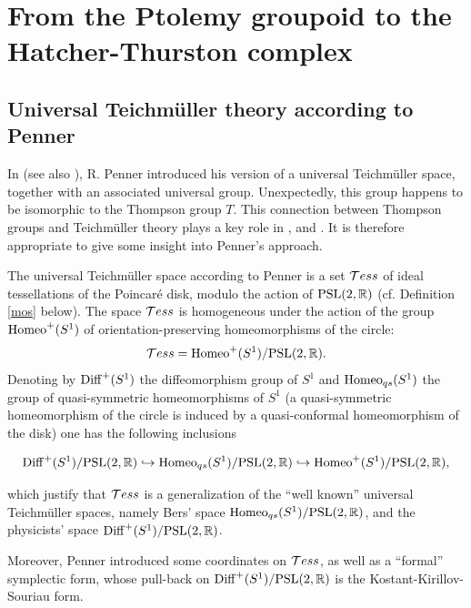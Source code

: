 \documentclass[twoside]{irmaems}
\theoremstyle{plain}
\theoremstyle{definition}
\theoremstyle{remark}
\newcommand{\R}{{\mathbb{R}}}
\begin{document}
\section{From the Ptolemy  groupoid to the Hatcher-Thurston complex}

\subsection{Universal Teichm\"uller theory according to Penner}

In \cite{pe0} (see also \cite{pe}), R. Penner introduced his version of a universal Teichm\"uller space, together with an associated universal group. 
Unexpectedly, this group happens to be 
isomorphic to the Thompson group $T$. This connection  between Thompson groups and Teichm\" uller 
theory plays a key role in \cite{fu-ka1}, \cite{fu-ka2} and \cite{fu-ka3}. It is therefore appropriate to 
give some insight into Penner's approach.


\vspace{0.1cm}\noindent 
The universal Teichm\"uller space  according to Penner is a set ${\cal T}ess$ of ideal tessellations of the Poincar\'e disk, modulo the action of ${\rm PSL}(2,\R)$ (cf. Definition \ref{mos} below). 
The space ${\cal T}ess$ is homogeneous under the action of the group ${\rm Homeo}^+(S^1)$
of orientation-preserving homeomorphisms of the circle:  
$${\cal T}ess={\rm Homeo}^+(S^1)/{\rm PSL}(2,\R).$$
Denoting by ${\rm Diff}^+(S^1)$ the diffeomorphism group of $S^1$ and ${\rm Homeo}_{qs}(S^1)$ 
the group of quasi-symmetric homeomorphisms of $S^1$
 (a quasi-symmetric homeomorphism of the circle is induced by 
 a quasi-conformal homeomorphism of 
 the disk) one has the following inclusions

$${\rm Diff}^+(S^1)/{\rm PSL}(2,\R) \hookrightarrow {\rm Homeo}_{qs}(S^1)/{\rm PSL}(2,\R)\hookrightarrow {\rm Homeo}^+(S^1)/{\rm PSL}(2,\R),$$

\noindent which justify that ${\cal T}ess$ is a generalization of 
the ``well known'' universal Teichm\"uller spaces, namely Bers' space 
${\rm Homeo}_{qs}(S^1)/{\rm PSL}(2,\R)$, and the physicists' space ${\rm Diff}^+(S^1)/{\rm PSL}(2,\R)$.

\vspace{0.1cm}\noindent 
\noindent Moreover, Penner introduced some coordinates on
 ${\cal T}ess$, as well as  a ``formal'' symplectic form, whose pull-back 
 on ${\rm Diff}^+(S^1)/{\rm PSL}(2,\R)$ is the Kostant-Kirillov-Souriau form.
\end{document}
